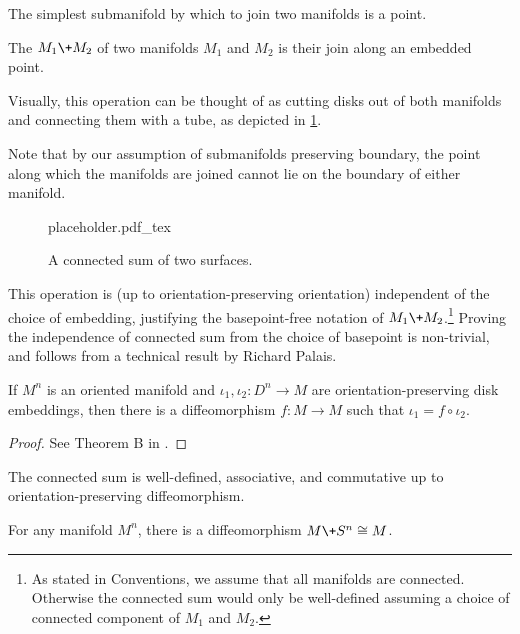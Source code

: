 The simplest submanifold by which to join two manifolds is a point.

\begin{definition}
	The  $M_1\+M_2$ of two manifolds $M_1$ and $M_2$ is their join along an embedded point.
\end{definition}

Visually, this operation can be thought of as cutting disks out of both manifolds and connecting them with a tube, as depicted in \cref{fig:connected-sum}.

\begin{remark}
	Note that by our assumption of submanifolds preserving boundary, the point along which the manifolds are joined cannot lie on the boundary of either manifold.
\end{remark}

\begin{figure}[ht]
	\centering
	{placeholder.pdf_tex}
	\caption{A connected sum of two surfaces.}\label{fig:connected-sum}
\end{figure}

This operation is (up to orientation-preserving orientation) independent of the choice of embedding, justifying the basepoint-free notation of $M_1\+ M_2$.\footnote{As stated in Conventions, we assume that all manifolds are connected. Otherwise the connected sum would only be well-defined assuming a choice of connected component of $M_1$ and $M_2$.}
Proving the independence of connected sum from the choice of basepoint is non-trivial, and follows from a technical result by Richard Palais.

\begin{theorem}\label{thm:disk}
	If $M^n$ is an oriented manifold and $\iota_1, \iota_2 : D^n \to M$ are orientation-preserving disk embeddings, then there is a diffeomorphism $f : M \to M$ such that $\iota_1 = f\circ \iota_2$.
\end{theorem}
\begin{proof}
	See Theorem B in \cite{palais1960diffeomorphism}.
\end{proof}

\begin{corollary}\label{cor:connected-sum-operation}
		The connected sum is well-defined, associative, and commutative up to orientation-preserving diffeomorphism.
\end{corollary}

\begin{corollary}
	For any manifold $M^n$, there is a diffeomorphism $M\+ S^n\cong M$.
\end{corollary}

